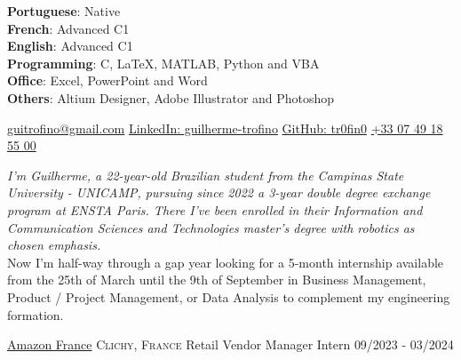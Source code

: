 \documentclass[8pt, a4paper]{article}
\begin{document}
\vspace{6mm}
\begin{multicols}{2}
    \vspace{2mm}
    \textbf{Portuguese}: Native\\
    \textbf{French}: Advanced C1\\
    \textbf{English}: Advanced C1\\
    \columnbreak
    \vspace{2mm}
    \textbf{Programming}: C, LaTeX, MATLAB, Python and VBA\\
    \textbf{Office}: Excel, PowerPoint and Word\\
    \textbf{Others}: Altium Designer, Adobe Illustrator and Photoshop\\
\end{multicols}




\bull\href{mailto:guitrofino@gmail.com}{guitrofino@gmail.com}                           %
\bull\href{https://www.linkedin.com/in/guilherme-trofino/}{LinkedIn: guilherme-trofino} %
\bull\href{https://github.com/tr0fin0}{GitHub: tr0fin0}                                 %
\bull\href{tel:+330749185500}{+33 07 49 18 55 00}                                       %

\spacedhrule{0.9em}{-0.4em}


\begin{multicols}{2}
\noindent \textit{I'm Guilherme, a 22-year-old Brazilian student from the Campinas State University - UNICAMP, pursuing since 2022 a 3-year double degree exchange program at ENSTA Paris. There I've been enrolled in their Information and Communication Sciences and Technologies master's degree with robotics as chosen emphasis.}\\
\noindent Now I'm half-way through a gap year looking for a 5-month internship available from the 25th of March until the 9th of September in Business Management, Product / Project Management, or Data Analysis to complement my engineering formation.
\end{multicols}

\spacedhrule{0.5em}{-0.4em}


\headedsection
    {\href{https://www.aboutamazon.fr/}{Amazon France}}
    {\textsc{Clichy, France}}
    {
        \headedsubsection
        {Retail Vendor Manager Intern}
        {09/2023 - 03/2024}
        {}
    }
\end{document}
